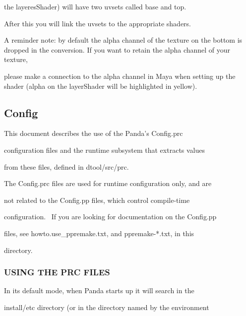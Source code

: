 \documentclass[a4paper]{article}
\begin{document}
{\color{black}
the layeresShader) will have two uvsets called {\textquotedbl}base{\textquotedbl} and
{\textquotedbl}top{\textquotedbl}.}


\bigskip

{\color{black}
After this you will link the uvsets to the appropriate shaders.}


\bigskip

{\color{black}
A reminder note: by default the alpha channel of the texture on the bottom is dropped in the conversion. If you want to
retain the alpha channel of your texture, }

{\color{black}
please make a connection to the alpha channel in Maya when setting up the shader (alpha on the layerShader will be
highlighted in yellow).}


\bigskip

\clearpage\subsection[Config]{Config}
\hypertarget{RefHeading312281927442421}{}{\color{black}
This document describes the use of the Panda's Config.prc}

{\color{black}
configuration files and the runtime subsystem that extracts values}

{\color{black}
from these files, defined in dtool/src/prc.}


\bigskip

{\color{black}
The Config.prc files are used for runtime configuration only, and are}

{\color{black}
not related to the Config.pp files, which control compile-time}

{\color{black}
configuration. \ If you are looking for documentation on the Config.pp}

{\color{black}
files, see howto.use\_ppremake.txt, and ppremake-*.txt, in this}

{\color{black}
directory.}


\bigskip


\bigskip

\subsubsection[USING THE PRC FILES]{USING THE PRC FILES}
\hypertarget{RefHeading312301927442421}{}
\bigskip

{\color{black}
In its default mode, when Panda starts up it will search in the}

{\color{black}
install/etc directory (or in the directory named by the environment}
\end{document}
